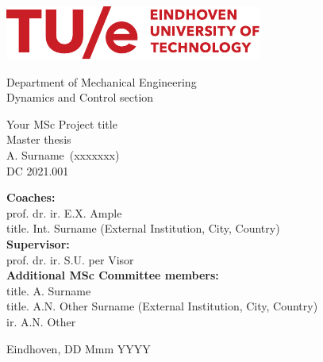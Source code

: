 \documentclass[11pt]{report}
\numberwithin{equation}{chapter}		%
\numberwithin{figure}{chapter}			%
\numberwithin{table}{chapter}			%
\newcommand{\deltitle}{Your MSc Project title}        %
\newcommand{\StudentName}{A. Surname}               %
\newcommand{\StudentID}{xxxxxxx}                    %
\newcommand{\DCcode}{2021.001}                      %
\begin{document}
\begin{titlepage}
\centering
\includegraphics[scale=1.9]{graphics/TUE-logo.pdf}\\[0mm]
\begin{center}
	{\Large Department of Mechanical Engineering}\\[2mm]
	{\Large Dynamics and Control section}\\[20mm]
\end{center}

\begin{center}
	{\Huge \deltitle}\\[2mm]
	{\Large Master thesis}\\[2mm]
	{\large \StudentName \ (\StudentID)}\\[1mm]
	{\large DC \DCcode}\\[70mm]
\end{center}
	
\flushleft\large {\textbf{Coaches:}} \\
{prof. dr. ir. E.X. Ample}   \\    
{title. Int. Surname (External Institution, City, Country)}  \\ %


\flushleft\large {\textbf{Supervisor:}} \\
{prof. dr. ir. S.U. per Visor}             \\

\flushleft\large {\textbf{Additional MSc Committee members:}} \\
{title. A. Surname}  \\  
{title. A.N. Other Surname (External Institution, City, Country)}  \\  %
{ir. A.N. Other}                 

\vfill\center Eindhoven, DD Mmm YYYY \\ %
	
\end{titlepage}
\end{document}

